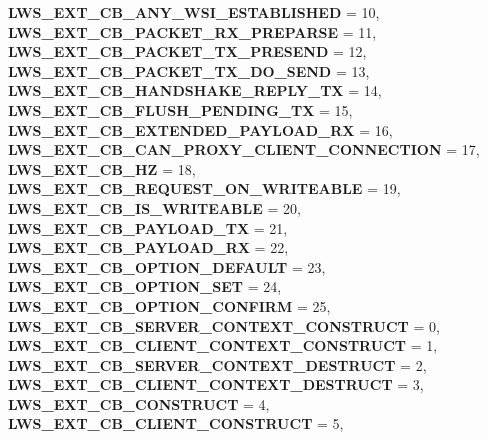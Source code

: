 \begin{DoxyCompactItemize}
{\bfseries L\+W\+S\+\_\+\+E\+X\+T\+\_\+\+C\+B\+\_\+\+A\+N\+Y\+\_\+\+W\+S\+I\+\_\+\+E\+S\+T\+A\+B\+L\+I\+S\+H\+ED} = 10, 
{\bfseries L\+W\+S\+\_\+\+E\+X\+T\+\_\+\+C\+B\+\_\+\+P\+A\+C\+K\+E\+T\+\_\+\+R\+X\+\_\+\+P\+R\+E\+P\+A\+R\+SE} = 11, 
\newline
{\bfseries L\+W\+S\+\_\+\+E\+X\+T\+\_\+\+C\+B\+\_\+\+P\+A\+C\+K\+E\+T\+\_\+\+T\+X\+\_\+\+P\+R\+E\+S\+E\+ND} = 12, 
{\bfseries L\+W\+S\+\_\+\+E\+X\+T\+\_\+\+C\+B\+\_\+\+P\+A\+C\+K\+E\+T\+\_\+\+T\+X\+\_\+\+D\+O\+\_\+\+S\+E\+ND} = 13, 
{\bfseries L\+W\+S\+\_\+\+E\+X\+T\+\_\+\+C\+B\+\_\+\+H\+A\+N\+D\+S\+H\+A\+K\+E\+\_\+\+R\+E\+P\+L\+Y\+\_\+\+TX} = 14, 
{\bfseries L\+W\+S\+\_\+\+E\+X\+T\+\_\+\+C\+B\+\_\+\+F\+L\+U\+S\+H\+\_\+\+P\+E\+N\+D\+I\+N\+G\+\_\+\+TX} = 15, 
\newline
{\bfseries L\+W\+S\+\_\+\+E\+X\+T\+\_\+\+C\+B\+\_\+\+E\+X\+T\+E\+N\+D\+E\+D\+\_\+\+P\+A\+Y\+L\+O\+A\+D\+\_\+\+RX} = 16, 
{\bfseries L\+W\+S\+\_\+\+E\+X\+T\+\_\+\+C\+B\+\_\+\+C\+A\+N\+\_\+\+P\+R\+O\+X\+Y\+\_\+\+C\+L\+I\+E\+N\+T\+\_\+\+C\+O\+N\+N\+E\+C\+T\+I\+ON} = 17, 
{\bfseries L\+W\+S\+\_\+\+E\+X\+T\+\_\+\+C\+B\+\_\+HZ} = 18, 
{\bfseries L\+W\+S\+\_\+\+E\+X\+T\+\_\+\+C\+B\+\_\+\+R\+E\+Q\+U\+E\+S\+T\+\_\+\+O\+N\+\_\+\+W\+R\+I\+T\+E\+A\+B\+LE} = 19, 
\newline
{\bfseries L\+W\+S\+\_\+\+E\+X\+T\+\_\+\+C\+B\+\_\+\+I\+S\+\_\+\+W\+R\+I\+T\+E\+A\+B\+LE} = 20, 
{\bfseries L\+W\+S\+\_\+\+E\+X\+T\+\_\+\+C\+B\+\_\+\+P\+A\+Y\+L\+O\+A\+D\+\_\+\+TX} = 21, 
{\bfseries L\+W\+S\+\_\+\+E\+X\+T\+\_\+\+C\+B\+\_\+\+P\+A\+Y\+L\+O\+A\+D\+\_\+\+RX} = 22, 
{\bfseries L\+W\+S\+\_\+\+E\+X\+T\+\_\+\+C\+B\+\_\+\+O\+P\+T\+I\+O\+N\+\_\+\+D\+E\+F\+A\+U\+LT} = 23, 
\newline
{\bfseries L\+W\+S\+\_\+\+E\+X\+T\+\_\+\+C\+B\+\_\+\+O\+P\+T\+I\+O\+N\+\_\+\+S\+ET} = 24, 
{\bfseries L\+W\+S\+\_\+\+E\+X\+T\+\_\+\+C\+B\+\_\+\+O\+P\+T\+I\+O\+N\+\_\+\+C\+O\+N\+F\+I\+RM} = 25, 
{\bfseries L\+W\+S\+\_\+\+E\+X\+T\+\_\+\+C\+B\+\_\+\+S\+E\+R\+V\+E\+R\+\_\+\+C\+O\+N\+T\+E\+X\+T\+\_\+\+C\+O\+N\+S\+T\+R\+U\+CT} = 0, 
{\bfseries L\+W\+S\+\_\+\+E\+X\+T\+\_\+\+C\+B\+\_\+\+C\+L\+I\+E\+N\+T\+\_\+\+C\+O\+N\+T\+E\+X\+T\+\_\+\+C\+O\+N\+S\+T\+R\+U\+CT} = 1, 
\newline
{\bfseries L\+W\+S\+\_\+\+E\+X\+T\+\_\+\+C\+B\+\_\+\+S\+E\+R\+V\+E\+R\+\_\+\+C\+O\+N\+T\+E\+X\+T\+\_\+\+D\+E\+S\+T\+R\+U\+CT} = 2, 
{\bfseries L\+W\+S\+\_\+\+E\+X\+T\+\_\+\+C\+B\+\_\+\+C\+L\+I\+E\+N\+T\+\_\+\+C\+O\+N\+T\+E\+X\+T\+\_\+\+D\+E\+S\+T\+R\+U\+CT} = 3, 
{\bfseries L\+W\+S\+\_\+\+E\+X\+T\+\_\+\+C\+B\+\_\+\+C\+O\+N\+S\+T\+R\+U\+CT} = 4, 
{\bfseries L\+W\+S\+\_\+\+E\+X\+T\+\_\+\+C\+B\+\_\+\+C\+L\+I\+E\+N\+T\+\_\+\+C\+O\+N\+S\+T\+R\+U\+CT} = 5, 

\end{DoxyCompactItemize}
